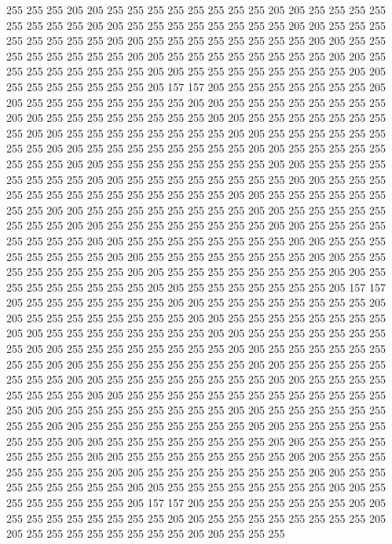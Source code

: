 255 255 255 205 205 255 255 255 255 255 255 255 255 205 205 255 255 255 255 255
255 255 255 205 205 255 255 255 255 255 255 255 255 205 205 255 255 255 255 255
255 255 255 205 205 255 255 255 255 255 255 255 255 205 205 255 255 255 255 255
255 255 255 205 205 255 255 255 255 255 255 255 255 205 205 255 255 255 255 255
255 255 255 205 205 255 255 255 255 255 255 255 255 205 205 255 255 255 255 255
255 255 205 157 157 205 255 255 255 255 255 255 255 205 205 255 255 255 255 255
255 255 255 205 205 255 255 255 255 255 255 255 255 205 205 255 255 255 255 255
255 255 255 205 205 255 255 255 255 255 255 255 255 205 205 255 255 255 255 255
255 255 255 205 205 255 255 255 255 255 255 255 255 205 205 255 255 255 255 255
255 255 255 205 205 255 255 255 255 255 255 255 255 205 205 255 255 255 255 255
255 255 255 205 205 255 255 255 255 255 255 255 255 205 205 255 255 255 255 255
255 255 255 205 205 255 255 255 255 255 255 255 255 255 255 255 255 255 255 205
205 255 255 255 255 255 255 255 255 205 205 255 255 255 255 255 255 255 255 205
205 255 255 255 255 255 255 255 255 205 205 255 255 255 255 255 255 255 255 205
205 255 255 255 255 255 255 255 255 205 205 255 255 255 255 255 255 255 255 205
205 255 255 255 255 255 255 255 255 205 205 255 255 255 255 255 255 255 255 205
205 255 255 255 255 255 255 255 255 205 205 255 255 255 255 255 255 255 255 205
205 255 255 255 255 255 255 255 255 205 205 255 255 255 255 255 255 255 205 157
157 205 255 255 255 255 255 255 255 205 205 255 255 255 255 255 255 255 255 205
205 255 255 255 255 255 255 255 255 205 205 255 255 255 255 255 255 255 255 205
205 255 255 255 255 255 255 255 255 205 205 255 255 255 255 255 255 255 255 205
205 255 255 255 255 255 255 255 255 205 205 255 255 255 255 255 255 255 255 205
205 255 255 255 255 255 255 255 255 205 205 255 255 255 255 255 255 255 255 205
205 255 255 255 255 255 255 255 255 205 205 255 255 255 255 255 255 255 255 205
205 255 255 255 255 255 255 255 255 255 255 255 255 255 255 205 205 255 255 255
255 255 255 255 255 205 205 255 255 255 255 255 255 255 255 205 205 255 255 255
255 255 255 255 255 205 205 255 255 255 255 255 255 255 255 205 205 255 255 255
255 255 255 255 255 205 205 255 255 255 255 255 255 255 255 205 205 255 255 255
255 255 255 255 255 205 205 255 255 255 255 255 255 255 255 205 205 255 255 255
255 255 255 255 255 205 205 255 255 255 255 255 255 255 255 205 205 255 255 255
255 255 255 255 255 205 205 255 255 255 255 255 255 255 205 157 157 205 255 255
255 255 255 255 255 205 205 255 255 255 255 255 255 255 255 205 205 255 255 255
255 255 255 255 255 205 205 255 255 255 255 255 255 255 255 205 205 255 255 255
